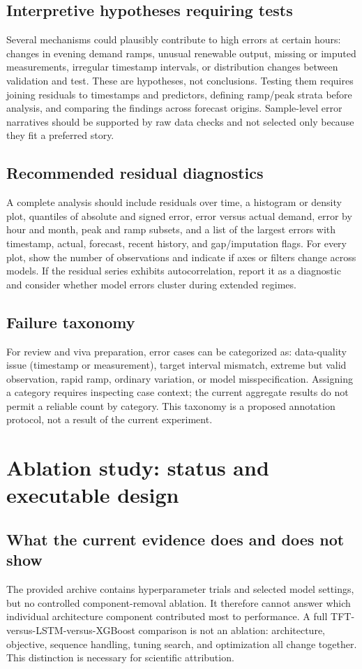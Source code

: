 \documentclass[12pt,a4paper]{article}
\begin{document}
\subsection{Interpretive hypotheses requiring tests}
Several mechanisms could plausibly contribute to high errors at certain hours: changes in evening demand ramps, unusual renewable output, missing or imputed measurements, irregular timestamp intervals, or distribution changes between validation and test. These are hypotheses, not conclusions. Testing them requires joining residuals to timestamps and predictors, defining ramp/peak strata before analysis, and comparing the findings across forecast origins. Sample-level error narratives should be supported by raw data checks and not selected only because they fit a preferred story.

\subsection{Recommended residual diagnostics}
A complete analysis should include residuals over time, a histogram or density plot, quantiles of absolute and signed error, error versus actual demand, error by hour and month, peak and ramp subsets, and a list of the largest errors with timestamp, actual, forecast, recent history, and gap/imputation flags. For every plot, show the number of observations and indicate if axes or filters change across models. If the residual series exhibits autocorrelation, report it as a diagnostic and consider whether model errors cluster during extended regimes.

\subsection{Failure taxonomy}
For review and viva preparation, error cases can be categorized as: data-quality issue (timestamp or measurement), target interval mismatch, extreme but valid observation, rapid ramp, ordinary variation, or model misspecification. Assigning a category requires inspecting case context; the current aggregate results do not permit a reliable count by category. This taxonomy is a proposed annotation protocol, not a result of the current experiment.

\newpage
\section{Ablation study: status and executable design}
\subsection{What the current evidence does and does not show}
The provided archive contains hyperparameter trials and selected model settings, but no controlled component-removal ablation. It therefore cannot answer which individual architecture component contributed most to performance. A full TFT-versus-LSTM-versus-XGBoost comparison is not an ablation: architecture, objective, sequence handling, tuning search, and optimization all change together. This distinction is necessary for scientific attribution.
\end{document}
